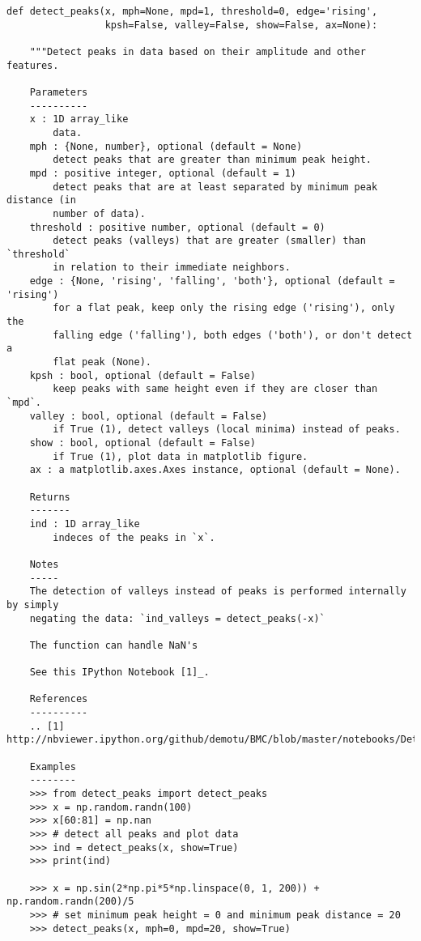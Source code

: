 \documentclass[]{article}
\begin{document}
\begin{verbatim}
def detect_peaks(x, mph=None, mpd=1, threshold=0, edge='rising',
                 kpsh=False, valley=False, show=False, ax=None):

    """Detect peaks in data based on their amplitude and other features.

    Parameters
    ----------
    x : 1D array_like
        data.
    mph : {None, number}, optional (default = None)
        detect peaks that are greater than minimum peak height.
    mpd : positive integer, optional (default = 1)
        detect peaks that are at least separated by minimum peak distance (in
        number of data).
    threshold : positive number, optional (default = 0)
        detect peaks (valleys) that are greater (smaller) than `threshold`
        in relation to their immediate neighbors.
    edge : {None, 'rising', 'falling', 'both'}, optional (default = 'rising')
        for a flat peak, keep only the rising edge ('rising'), only the
        falling edge ('falling'), both edges ('both'), or don't detect a
        flat peak (None).
    kpsh : bool, optional (default = False)
        keep peaks with same height even if they are closer than `mpd`.
    valley : bool, optional (default = False)
        if True (1), detect valleys (local minima) instead of peaks.
    show : bool, optional (default = False)
        if True (1), plot data in matplotlib figure.
    ax : a matplotlib.axes.Axes instance, optional (default = None).

    Returns
    -------
    ind : 1D array_like
        indeces of the peaks in `x`.

    Notes
    -----
    The detection of valleys instead of peaks is performed internally by simply
    negating the data: `ind_valleys = detect_peaks(-x)`
    
    The function can handle NaN's 

    See this IPython Notebook [1]_.

    References
    ----------
    .. [1] http://nbviewer.ipython.org/github/demotu/BMC/blob/master/notebooks/DetectPeaks.ipynb

    Examples
    --------
    >>> from detect_peaks import detect_peaks
    >>> x = np.random.randn(100)
    >>> x[60:81] = np.nan
    >>> # detect all peaks and plot data
    >>> ind = detect_peaks(x, show=True)
    >>> print(ind)

    >>> x = np.sin(2*np.pi*5*np.linspace(0, 1, 200)) + np.random.randn(200)/5
    >>> # set minimum peak height = 0 and minimum peak distance = 20
    >>> detect_peaks(x, mph=0, mpd=20, show=True)


\end{verbatim}
\end{document}
